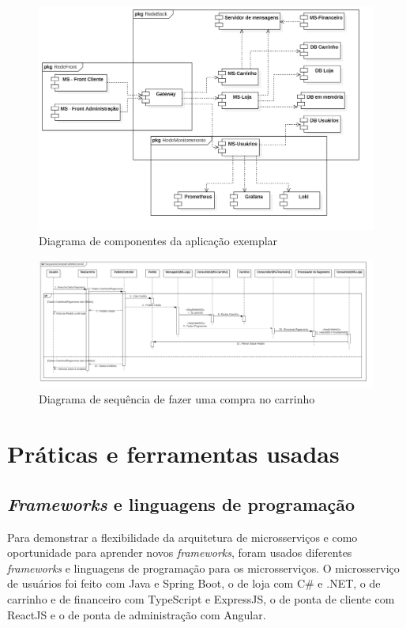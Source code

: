 \begin{figure}[htb]
	\caption{\label{figura-diagrama-de-componentes}Diagrama de componentes da aplicação exemplar}
	\begin{center}
	    \includegraphics[scale=0.27]{Diagramas/imagens/Componentes-Redes.jpg}
	\end{center}
\end{figure}

\begin{figure}[htb]
	\caption{\label{figura-diagrama-de-sequencia}Diagrama de sequência de fazer uma compra no carrinho}
	\begin{center}
	    \includegraphics[scale=0.16]{Diagramas/imagens/SequenciaComprarCarrinhoComAlt.jpg}
	\end{center}
\end{figure}


\section{Práticas e ferramentas usadas}
\subsection*{\emph{Frameworks} e linguagens de programação}
Para demonstrar a flexibilidade da arquitetura de microsserviços e como oportunidade para aprender novos \emph{frameworks}, foram usados diferentes \emph{frameworks} e linguagens de programação para os microsserviços. O microsserviço de usuários foi feito com Java e Spring Boot, o de loja com C\# e .NET, o de carrinho e de financeiro com TypeScript e ExpressJS, o de ponta de cliente com ReactJS e o de ponta de administração com Angular.

